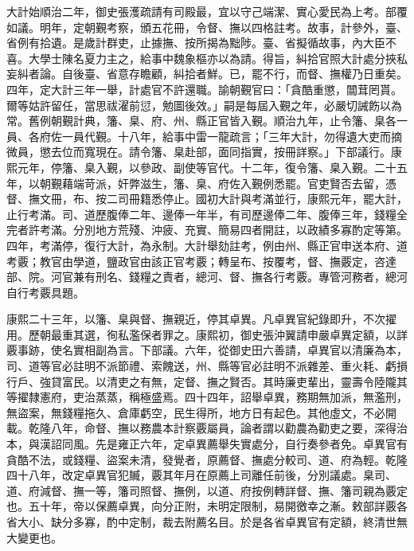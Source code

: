 \begin{pinyinscope}
大計始順治二年，御史張濩疏請有司殿最，宜以守己端潔、實心愛民為上考。部覆如議。明年，定朝覲考察，頒五花冊，令督、撫以四格註考。故事，計參外，臺、省例有拾遺。是歲計群吏，止據撫、按所揭為黜陟。臺、省擬循故事，內大臣不喜。大學士陳名夏力主之，給事中魏象樞亦以為請。得旨，糾拾官照大計處分挾私妄糾者論。自後臺、省意存瞻顧，糾拾者鮮。已，罷不行，而督、撫權乃日重矣。四年，定大計三年一舉，計處官不許還職。諭朝覲官曰：「貪酷重懲，闒茸罔貰。爾等姑許留任，當思祓濯前愆，勉圖後效。」嗣是每屆入覲之年，必嚴切誡飭以為常。舊例朝覲計典，籓、臬、府、州、縣正官皆入覲。順治九年，止令籓、臬各一員、各府佐一員代覲。十八年，給事中雷一龍疏言；「三年大計，勿得遺大吏而摘微員，懲去位而寬現在。請令籓、臬赴部，面同指實，按冊詳察。」下部議行。康熙元年，停籓、臬入覲，以參政、副使等官代。十二年，復令籓、臬入覲。二十五年，以朝覲藉端苛派，奸弊滋生，籓、臬、府佐入覲例悉罷。官吏賢否去留，憑督、撫文冊，布、按二司冊籍悉停止。國初大計與考滿並行，康熙元年，罷大計，止行考滿。司、道歷腹俸二年、邊俸一年半，有司歷邊俸二年、腹俸三年，錢糧全完者許考滿。分別地方荒殘、沖疲、充實、簡易四者開註，以政績多寡酌定等第。四年，考滿停，復行大計，為永制。大計舉劾註考，例由州、縣正官申送本府、道考覈；教官由學道，鹽政官由該正官考覈；轉呈布、按覆考，督、撫覈定，咨達部、院。河官兼有刑名、錢糧之責者，總河、督、撫各行考覈。專管河務者，總河自行考覈具題。

康熙二十三年，以籓、臬與督、撫親近，停其卓異。凡卓異官紀錄即升，不次擢用。歷朝最重其選，徇私濫保者罪之。康熙初，御史張沖翼請申嚴卓異定額，以詳覈事跡，使名實相副為言。下部議。六年，從御史田六善請，卓異官以清廉為本，司、道等官必註明不派節禮、索餽送，州、縣等官必註明不派雜差、重火耗、虧損行戶、強貸富民。以清吏之有無，定督、撫之賢否。其時廉吏輩出，靈壽令陸隴其等擢隸憲府，吏治蒸蒸，稱極盛焉。四十四年，詔舉卓異，務期無加派，無濫刑，無盜案，無錢糧拖久、倉庫虧空，民生得所，地方日有起色。其他虛文，不必開載。乾隆八年，命督、撫以務農本計察覈屬員，論者謂以勸農為勸吏之要，深得治本，與漢詔同風。先是雍正六年，定卓異薦舉失實處分，自行奏參者免。卓異官有貪酷不法，或錢糧、盜案未清，發覺者，原薦督、撫處分較司、道、府為輕。乾隆四十八年，改定卓異官犯贓，覈其年月在原薦上司離任前後，分別議處。臬司、道、府減督、撫一等，籓司照督、撫例，以道、府按例轉詳督、撫、籓司親為覈定也。五十年，帝以保薦卓異，向分正附，未明定限制，易開徼幸之漸。敕部詳覈各省大小、缺分多寡，酌中定制，裁去附薦名目。於是各省卓異官有定額，終清世無大變更也。


\end{pinyinscope}
